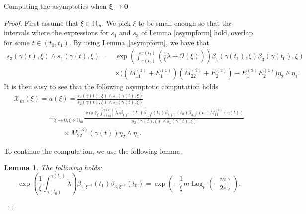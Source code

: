 \documentclass[11pt]{article}
\numberwithin{equation}{section}
\newtheorem{Lemma}[Theorem]{Lemma}
\numberwithin{equation}{section}
\newcommand{\MC}{\mathcal{X}_m}
\begin{document}
\begin{subsubsection}{Computing the asymptotics when $\boldsymbol{\xi \to 0}$}
\begin{proof}
First assume that $\xi \in \mathbb{H}_m$. We pick $\xi$ to be small enough so that the intervals where the expressions for $s_1$ and $s_3$ of Lemma \ref{asympform} hold, overlap for some $t\in (t_0,t_1)$. By using Lemma~\ref{asympform}, we have that
\begin{align*}
 s_3(\gamma(t),\xi)\wedge s_1(\gamma(t),\xi)
 ={}& \exp \left(\int_{\gamma(t_0)}^{\gamma(t_1)}\left(\frac{1}{\xi}\widetilde{\lambda}+\mathcal{O}(\xi)\right)\right)\beta_1(\gamma(t_1),\xi)\beta_3(\gamma(t_0),\xi)\\
 &\times\bigl((M^{(1)}_{11}+E_{1}^{(1)})(M_{22}^{(3)}+E_{2}^{(3)})-E_1^{(3)}E_2^{(1)}\bigr)\eta_2\wedge \eta_1.
\end{align*}
It is then easy to see that the following asymptotic computation holds
\begin{gather*}
 \MC(\xi)=a(\xi)=\frac{s_3(\gamma(t),\xi)\wedge s_1(\gamma(t),\xi)}{s_2(\gamma(t),\xi)\wedge s_1(\gamma(t),\xi)}\\
 \phantom{ \MC(\xi)=}{}\sim_{\xi \to 0, \xi \in \mathbb{H}_m}\frac{\exp \bigl(\frac{1}{\xi}\int_{\gamma(t_0)}^{\gamma(t_1)}\widetilde{\lambda}\bigr)\beta_{1,\xi^{-1}}(t_1)\beta_{1,\xi^{0}}
 (t_1)\beta_{3,\xi^{-1}}(t_0)\beta_{3,\xi^{0}}(t_0)M_{11}^{(1)}(\gamma(t))}{s_2(\gamma(t),\xi)\wedge s_1(\gamma(t),\xi)}\\
\phantom{\qquad\sim_{\xi \to 0, \xi \in \mathbb{H}_m}}{} \times M_{22}^{(3)}(\gamma(t))\eta_2\wedge \eta_1.
\end{gather*}

To continue the computation, we use the following lemma.

\begin{Lemma}\label{auxasylemma} The following holds:
\begin{equation*}
 \exp \left(\frac{1}{\xi}\int_{\gamma(t_0)}^{\gamma(t_1)}\widetilde{\lambda}\right)\beta_{1,\xi^{-1}}(t_1)\beta_{3,\xi^{-1}}(t_0)
 =\exp \left(-\frac{1}{\xi}m\operatorname{Log}_p\left(-\frac{m}{2e}\right)\right).
\end{equation*}


\end{Lemma}


\end{proof}
\end{subsubsection}
\end{document}
